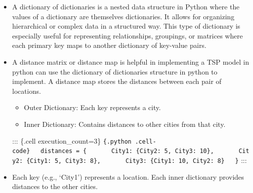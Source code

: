 \documentclass[
  letterpaper,
  DIV=11,
  numbers=noendperiod]{scrreprt}
\providecommand{\tightlist}{%
  \setlength{\itemsep}{0pt}\setlength{\parskip}{0pt}}\usepackage{longtable,booktabs,array}
\begin{document}
\begin{itemize}
\item
  A dictionary of dictionaries is a nested data structure in Python
  where the values of a dictionary are themselves dictionaries. It
  allows for organizing hierarchical or complex data in a structured
  way. This type of dictionary is especially useful for representing
  relationships, groupings, or matrices where each primary key maps to
  another dictionary of key-value pairs.
\item
  A distance matrix or distance map is helpful in implementing a TSP
  model in python can use the dictionary of dictionaries structure in
  python to implement. A distance map stores the distances between each
  pair of locations.

  \begin{itemize}
  \tightlist
  \item
    Outer Dictionary: Each key represents a city.
  \item
    Inner Dictionary: Contains distances to other cities from that city.
  \end{itemize}

  ::: \{.cell execution\_count=3\}
  \texttt{\{.python\ .cell-code\}\ \ \ distances\ =\ \{\ \ \ \ \ \ \ \textquotesingle{}City1\textquotesingle{}:\ \{\textquotesingle{}City2\textquotesingle{}:\ 5,\ \textquotesingle{}City3\textquotesingle{}:\ 10\},\ \ \ \ \ \ \ \textquotesingle{}City2\textquotesingle{}:\ \{\textquotesingle{}City1\textquotesingle{}:\ 5,\ \textquotesingle{}City3\textquotesingle{}:\ 8\},\ \ \ \ \ \ \ \textquotesingle{}City3\textquotesingle{}:\ \{\textquotesingle{}City1\textquotesingle{}:\ 10,\ \textquotesingle{}City2\textquotesingle{}:\ 8\}\ \ \ \}}
  :::
\item
  Each key (e.g., `City1') represents a location. Each inner dictionary
  provides distances to the other cities.
\end{itemize}
\end{document}
